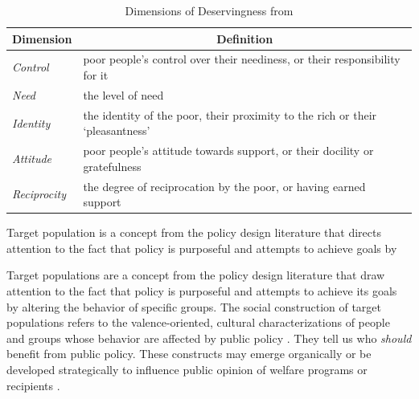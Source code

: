 \documentclass[12pt]{article}%
\begin{document}
\begin{doublespace}
\begin{table}[!h]
	\caption{Dimensions of Deservingness from \cite{van_oorschot_who_nodate}} 
	\label{one}
	\begin{tabular}{l|l}
		\textbf{Dimension}    & \multicolumn{1}{c}{\textbf{Definition}}                                       \\ \hline
		\textit{Control}     & poor people’s control over their neediness, or their responsibility for it    \\
		\textit{Need}        & the level of need                                                             \\
		\textit{Identity}    & the identity of the poor, their proximity to the rich or their ‘pleasantness’ \\
		\textit{Attitude}    & poor people’s attitude towards support, or their docility or gratefulness     \\
		\textit{Reciprocity} & the degree of reciprocation by the poor, or having earned support            
	\end{tabular}
\end{table}


Target population is a concept from the policy design
literature that directs attention to the fact that policy
is purposeful and attempts to achieve goals by

Target populations are a concept from the policy design literature that draw attention to the fact that policy is purposeful and attempts to achieve its goals by altering the behavior of specific groups. The social construction of target populations refers to the valence-oriented, cultural characterizations of people and groups whose behavior are affected by public policy \citep{schneider_social_1993, schneider2005deserving}. They tell us who \textit{should} benefit from public policy. These constructs may emerge organically or be developed strategically to influence public opinion of welfare programs or recipients \citep{ingram1993constructing}. %


\end{doublespace}
\end{document}
